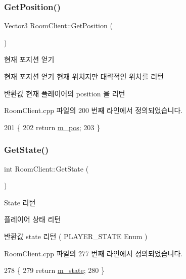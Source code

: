 \subsubsection{\texorpdfstring{Get\+Position()}{GetPosition()}}
{\footnotesize\ttfamily Vector3 Room\+Client\+::\+Get\+Position (\begin{DoxyParamCaption}{ }\end{DoxyParamCaption})}



현재 포지션 얻기 

현재 포지션 얻기  현재 위치지만 대략적인 위치를 리턴

\begin{DoxyReturn}{반환값}
현재 플레이어의 position 을 리턴 
\end{DoxyReturn}


Room\+Client.\+cpp 파일의 200 번째 라인에서 정의되었습니다.


\begin{DoxyCode}
201 \{ 
202     \textcolor{keywordflow}{return} \hyperlink{class_room_client_a7000a6db44ab9d2f646d625d33c8d8b7}{m\_pos}; 
203 \}
\end{DoxyCode}
\mbox{\label{class_room_client_a813a45c92f0d6869546539093ab5c18a}} 
\subsubsection{\texorpdfstring{Get\+State()}{GetState()}}
{\footnotesize\ttfamily int Room\+Client\+::\+Get\+State (\begin{DoxyParamCaption}{ }\end{DoxyParamCaption})}



State 리턴 

플레이어 상태 리턴

\begin{DoxyReturn}{반환값}
state 리턴 ( P\+L\+A\+Y\+E\+R\+\_\+\+S\+T\+A\+TE Enum ) 
\end{DoxyReturn}


Room\+Client.\+cpp 파일의 277 번째 라인에서 정의되었습니다.


\begin{DoxyCode}
278 \{
279     \textcolor{keywordflow}{return} \hyperlink{class_room_client_a247e5deb46a11e0d1a0e8e9029d87d54}{m\_state};
280 \}
\end{DoxyCode}
\mbox{\label{class_room_client_a18c7c0229d3c71c755b33a57b804b996}} 

